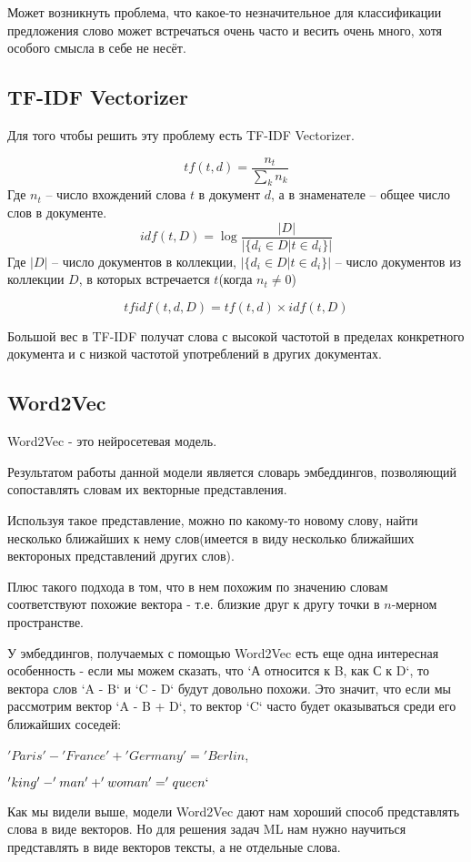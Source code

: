 Может возникнуть проблема, что какое-то незначительное для классификации предложения слово может встречаться очень часто и весить очень много, хотя особого смысла в себе не несёт.

\subsection{TF-IDF Vectorizer}
Для того чтобы решить эту проблему есть TF-IDF Vectorizer.

$$tf(t, d) = \frac{n_{t}}{\sum_{k} n_{k}}$$
Где $n_{t}$ -- число вхождений слова $t$ в документ $d$, а в знаменателе -- общее число слов в документе.
$$idf(t, D) = \log{\frac{|D|}{|\{d_{i} \in D | t \in d_{i}\}|}}$$
Где $|D|$ -- число документов в коллекции, $|\{d_{i} \in D | t \in d_{i}\}|$ -- число документов из коллекции $D$, в которых встречается $t$(когда $n_{t} \neq 0$)

$$tfidf(t, d, D) = tf(t, d) \times idf(t, D)$$

Большой вес в TF-IDF получат слова с высокой частотой в пределах конкретного документа и с низкой частотой употреблений в других документах.

\subsection{Word2Vec}
Word2Vec - это нейросетевая модель. 

Результатом работы данной модели является словарь эмбеддингов, позволяющий сопоставлять словам их векторные представления. 

Используя такое представление, можно по какому-то новому слову, найти несколько ближайших к нему слов(имеется в виду несколько ближайших вектороных представлений других слов).

Плюс такого подхода в том, что в нем похожим по значению словам соответствуют похожие вектора - т.е. близкие друг к другу точки в $n$-мерном пространстве.

У эмбеддингов, получаемых с помощью Word2Vec есть еще одна интересная особенность - если мы можем сказать, что `А относится к B, как С к D`, то вектора слов `A - B` и `C - D` будут довольно похожи. Это значит, что если мы рассмотрим вектор `A - B + D`, то вектор `C` часто будет оказываться среди его ближайших соседей: 

$'Paris' - 'France' + 'Germany' = 'Berlin$, 

$'king' - 'man' + 'woman' = 'queen`$

Как мы видели выше, модели Word2Vec дают нам хороший способ представлять слова в виде векторов. Но для решения задач ML нам нужно научиться представлять в виде векторов тексты, а не отдельные слова. 

